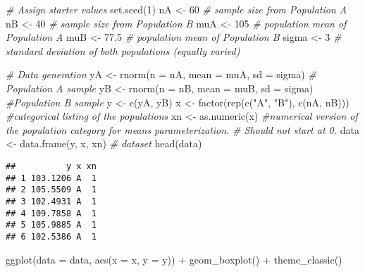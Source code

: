 \documentclass[
]{article}
\newenvironment{Shaded}{\begin{snugshade}}{\end{snugshade}}
\newcommand{\AttributeTok}[1]{\textcolor[rgb]{0.77,0.63,0.00}{#1}}
\newcommand{\CommentTok}[1]{\textcolor[rgb]{0.56,0.35,0.01}{\textit{#1}}}
\newcommand{\DecValTok}[1]{\textcolor[rgb]{0.00,0.00,0.81}{#1}}
\newcommand{\FloatTok}[1]{\textcolor[rgb]{0.00,0.00,0.81}{#1}}
\newcommand{\FunctionTok}[1]{\textcolor[rgb]{0.00,0.00,0.00}{#1}}
\newcommand{\NormalTok}[1]{#1}
\newcommand{\OtherTok}[1]{\textcolor[rgb]{0.56,0.35,0.01}{#1}}
\newcommand{\SpecialCharTok}[1]{\textcolor[rgb]{0.00,0.00,0.00}{#1}}
\newcommand{\StringTok}[1]{\textcolor[rgb]{0.31,0.60,0.02}{#1}}
\begin{document}
\begin{Shaded}
\begin{Highlighting}[]
\CommentTok{\# Assign starter values}
\FunctionTok{set.seed}\NormalTok{(}\DecValTok{1}\NormalTok{)}
\NormalTok{nA }\OtherTok{\textless{}{-}} \DecValTok{60}  \CommentTok{\# sample size from Population A}
\NormalTok{nB }\OtherTok{\textless{}{-}} \DecValTok{40}  \CommentTok{\# sample size from Population B}
\NormalTok{muA }\OtherTok{\textless{}{-}} \DecValTok{105}  \CommentTok{\# population mean of Population A}
\NormalTok{muB }\OtherTok{\textless{}{-}} \FloatTok{77.5}  \CommentTok{\# population mean of Population B}
\NormalTok{sigma }\OtherTok{\textless{}{-}} \DecValTok{3}  \CommentTok{\# standard deviation of both populations (equally varied)}

\CommentTok{\# Data generation}
\NormalTok{yA }\OtherTok{\textless{}{-}} \FunctionTok{rnorm}\NormalTok{(}\AttributeTok{n =}\NormalTok{ nA, }\AttributeTok{mean =}\NormalTok{ muA, }\AttributeTok{sd =}\NormalTok{ sigma)  }\CommentTok{\# Population A sample}
\NormalTok{yB }\OtherTok{\textless{}{-}} \FunctionTok{rnorm}\NormalTok{(}\AttributeTok{n =}\NormalTok{ nB, }\AttributeTok{mean =}\NormalTok{ muB, }\AttributeTok{sd =}\NormalTok{ sigma)  }\CommentTok{\#Population B sample}
\NormalTok{y }\OtherTok{\textless{}{-}} \FunctionTok{c}\NormalTok{(yA, yB)}
\NormalTok{x }\OtherTok{\textless{}{-}} \FunctionTok{factor}\NormalTok{(}\FunctionTok{rep}\NormalTok{(}\FunctionTok{c}\NormalTok{(}\StringTok{"A"}\NormalTok{, }\StringTok{"B"}\NormalTok{), }\FunctionTok{c}\NormalTok{(nA, nB)))  }\CommentTok{\#categorical listing of the populations}
\NormalTok{xn }\OtherTok{\textless{}{-}} \FunctionTok{as.numeric}\NormalTok{(x)  }\CommentTok{\#numerical version of the population category for means parameterization. }
\CommentTok{\# Should not start at 0.}
\NormalTok{data }\OtherTok{\textless{}{-}} \FunctionTok{data.frame}\NormalTok{(y, x, xn)  }\CommentTok{\# dataset}
\FunctionTok{head}\NormalTok{(data)}
\end{Highlighting}
\end{Shaded}

\begin{verbatim}
##          y x xn
## 1 103.1206 A  1
## 2 105.5509 A  1
## 3 102.4931 A  1
## 4 109.7858 A  1
## 5 105.9885 A  1
## 6 102.5386 A  1
\end{verbatim}

\begin{Shaded}
\begin{Highlighting}[]
\FunctionTok{ggplot}\NormalTok{(}\AttributeTok{data =}\NormalTok{ data, }\FunctionTok{aes}\NormalTok{(}\AttributeTok{x =}\NormalTok{ x, }\AttributeTok{y =}\NormalTok{ y)) }\SpecialCharTok{+} 
  \FunctionTok{geom\_boxplot}\NormalTok{() }\SpecialCharTok{+}
  \FunctionTok{theme\_classic}\NormalTok{()}
\end{Highlighting}
\end{Shaded}
\end{document}
